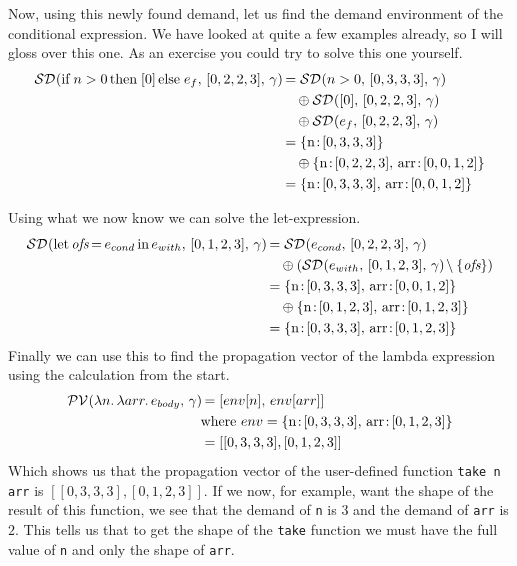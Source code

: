 \documentclass[../main.tex]{subfiles}
\begin{document}
%
Now, using this newly found demand, let us find the demand environment of the conditional expression. We have looked at quite a few examples already, so I will gloss over this one. As an exercise you could try to solve this one yourself.
\begin{align*}
    \mathcal{SD}\hspace{-1.2pt} \left( \text{if}\; n > 0\, \text{then}\; [0]\, \text{else}\; e_f,\, [0,2,2,3],\, \gamma \right) \hspace{-1pt}
        &= \mathcal{SD}\hspace{-1.2pt} \left( n > 0,\, [0,3,3,3],\, \gamma \right) \hspace{-1pt}
            \\&\hspace{1em}\oplus \mathcal{SD}\hspace{-1.2pt} \left( [0],\, [0,2,2,3],\, \gamma \right) \hspace{-1pt}
            \\&\hspace{1em}\oplus \mathcal{SD}\hspace{-1.2pt} \left( e_f,\, [0,2,2,3],\, \gamma \right) \hspace{-1pt} \\
        &= \{ \text{n}\colon\hspace{-2pt}[0,3,3,3] \}
            \\&\hspace{1em}\oplus \{ \text{n}\colon\hspace{-2pt}[0,2,2,3],\, \text{arr}\colon\hspace{-2pt}[0,0,1,2] \} \\
        &= \{ \text{n}\colon\hspace{-2pt}[0,3,3,3],\, \text{arr}\colon\hspace{-2pt}[0,0,1,2] \}
\end{align*}
\iffalse
\begin{align*}
    \sd{(\selexpr{[0]}{(\shpexpr{arr})}) + n}{[0,2,2,3]}
        &= \sd{\selexpr{[0]}{(\shpexpr{arr})}}{[0,2,2,3]}
            \oplusnl \sd{n}{[0,2,2,3]} \\
        &= \{ \dem{arr}{[0,0,1,2]} \} \oplus \{ \dem{n}{[0,2,2,3]} \} \\
        &= \{ \dem{arr}{[0,0,1,2]},\, \dem{n}{[0,2,2,3]} \} \\
    \sd{\selexpr{[0]}{(\shpexpr{arr})}}{[0,2,2,3]}
        &= \sd{[0]}{[0,2,2,3]}
            \oplusnl \sd{\shpexpr{arr}}{[0,1,2,3]} \\
        &= \sd{arr}{[0,0,1,2]} \\
        &= \{ \dem{arr}{[0,0,1,2]} \}
\end{align*}
\fi
%
Using what we now know we can solve the let-expression.
\begin{align*}
    \sd{\letexpr{\textit{ofs}}{e_{cond}}{e_{with}}}{[0,1,2,3]}
        &= \sd{e_{cond}}{[0,2,2,3]}
            \oplusnl (\sd{e_{with}}{[0,1,2,3]} \setminus \{\textit{ofs}\}) \\
        &= \{ \dem{n}{[0,3,3,3]},\, \dem{arr}{[0,0,1,2]} \}
            \oplusnl \{ \dem{n}{[0,1,2,3]},\, \dem{arr}{[0,1,2,3]} \} \\
        &= \{ \dem{n}{[0,3,3,3]},\, \dem{arr}{[0,1,2,3]} \}
\end{align*}
%
Finally we can use this to find the propagation vector of the lambda expression using the calculation from the start.
\begin{align*}
    \mathcal{PV}\hspace{-1.2pt} \left( \lambda n.\, \lambda arr.\, e_{body},\, \gamma \right) \hspace{-1pt}
        &= [env[n],\, env[arr]] \\
        &\text{where } env = \{ \text{n}\colon\hspace{-2pt}[0,3,3,3],\, \text{arr}\colon\hspace{-2pt}[0,1,2,3] \} \\
        &= [[0,3,3,3], [0,1,2,3]]
\end{align*}
%
Which shows us that the propagation vector of the user-defined function \texttt{take n arr} is $[[0,3,3,3], [0,1,2,3]]$. If we now, for example, want the shape of the result of this function, we see that the demand of \texttt{n} is $3$ and the demand of \texttt{arr} is $2$. This tells us that to get the shape of the \texttt{take} function we must have the full value of \texttt{n} and only the shape of \texttt{arr}.
\end{document}
